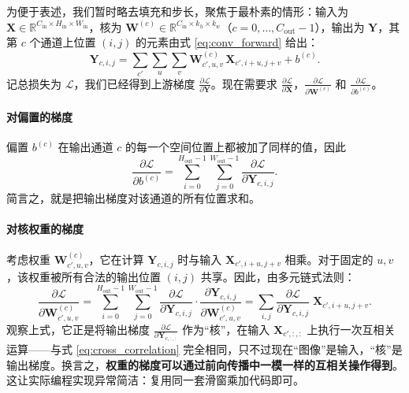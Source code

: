 为便于表述，我们暂时略去填充和步长，聚焦于最朴素的情形：输入为 $\mathbf{X}\in\mathbb{R}^{C_{\text{in}}\times H_{\text{in}}\times W_{\text{in}}}$，核为 $\mathbf{W}^{(c)}\in\mathbb{R}^{C_{\text{in}}\times k_h\times k_w}$（$c=0,\dots,C_{\text{out}}-1$），输出为 $\mathbf{Y}$，其第 $c$ 个通道上位置 $(i,j)$ 的元素由式 \eqref{eq:conv_forward} 给出：
\[
\mathbf{Y}_{c,i,j} = \sum_{c'}\sum_{u}\sum_{v} \mathbf{W}^{(c)}_{c',u,v} \, \mathbf{X}_{c', i+u, j+v} + b^{(c)}.
\]
记总损失为 $\mathcal{L}$，我们已经得到上游梯度 $\frac{\partial\mathcal{L}}{\partial \mathbf{Y}}$。现在需要求 $\frac{\partial\mathcal{L}}{\partial \mathbf{X}}$，$\frac{\partial\mathcal{L}}{\partial \mathbf{W}^{(c)}}$ 和 $\frac{\partial\mathcal{L}}{\partial b^{(c)}}$。

\paragraph{对偏置的梯度}
偏置 $b^{(c)}$ 在输出通道 $c$ 的每一个空间位置上都被加了同样的值，因此
\[
\frac{\partial\mathcal{L}}{\partial b^{(c)}} = \sum_{i=0}^{H_{\text{out}}-1}\sum_{j=0}^{W_{\text{out}}-1} \frac{\partial\mathcal{L}}{\partial \mathbf{Y}_{c,i,j}}.
\]
简言之，就是把输出梯度对该通道的所有位置求和。

\paragraph{对核权重的梯度}
考虑权重 $\mathbf{W}^{(c)}_{c',u,v}$，它在计算 $\mathbf{Y}_{c,i,j}$ 时与输入 $\mathbf{X}_{c', i+u, j+v}$ 相乘。对于固定的 $u,v$，该权重被所有合法的输出位置 $(i,j)$ 共享。因此，由多元链式法则：
\[
\frac{\partial\mathcal{L}}{\partial \mathbf{W}^{(c)}_{c',u,v}} = \sum_{i=0}^{H_{\text{out}}-1}\sum_{j=0}^{W_{\text{out}}-1} \frac{\partial\mathcal{L}}{\partial \mathbf{Y}_{c,i,j}} \cdot \frac{\partial \mathbf{Y}_{c,i,j}}{\partial \mathbf{W}^{(c)}_{c',u,v}}
= \sum_{i,j} \frac{\partial\mathcal{L}}{\partial \mathbf{Y}_{c,i,j}} \; \mathbf{X}_{c', i+u, j+v}.
\]
观察上式，它正是将输出梯度 $\frac{\partial\mathcal{L}}{\partial \mathbf{Y}_{c,:,:}}$ 作为“核”，在输入 $\mathbf{X}_{c',:,:}$ 上执行一次互相关运算——与式 \eqref{eq:cross_correlation} 完全相同，只不过现在“图像”是输入，“核”是输出梯度。换言之，\textbf{权重的梯度可以通过前向传播中一模一样的互相关操作得到}。这让实际编程实现异常简洁：复用同一套滑窗乘加代码即可。

